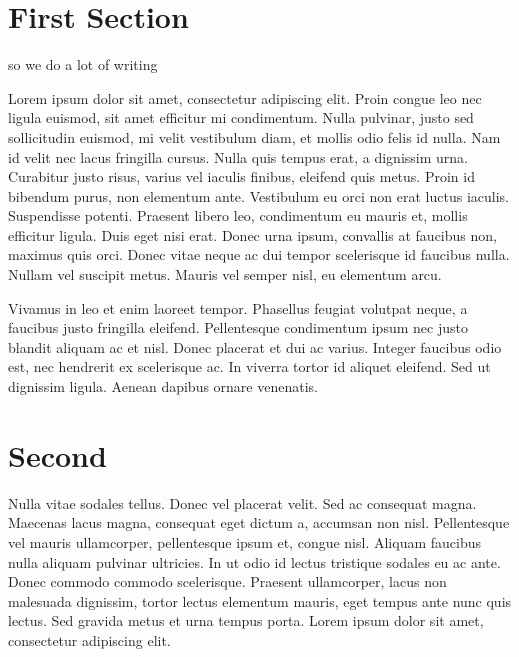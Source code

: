 \documentclass{article}
\begin{document}
    \begin{multicols}{2}
        \section{First Section}
        so we do a lot of writing

        Lorem ipsum dolor sit amet, consectetur adipiscing elit. Proin congue leo nec ligula euismod, sit amet efficitur mi condimentum. Nulla pulvinar, justo sed sollicitudin euismod, mi velit vestibulum diam, et mollis odio felis id nulla. Nam id velit nec lacus fringilla cursus. Nulla quis tempus erat, a dignissim urna. Curabitur justo risus, varius vel iaculis finibus, eleifend quis metus. Proin id bibendum purus, non elementum ante. Vestibulum eu orci non erat luctus iaculis. Suspendisse potenti. Praesent libero leo, condimentum eu mauris et, mollis efficitur ligula. Duis eget nisi erat. Donec urna ipsum, convallis at faucibus non, maximus quis orci. Donec vitae neque ac dui tempor scelerisque id faucibus nulla. Nullam vel suscipit metus. Mauris vel semper nisl, eu elementum arcu.

        Vivamus in leo et enim laoreet tempor. Phasellus feugiat volutpat neque, a faucibus justo fringilla eleifend. Pellentesque condimentum ipsum nec justo blandit aliquam ac et nisl. Donec placerat et dui ac varius. Integer faucibus odio est, nec hendrerit ex scelerisque ac. In viverra tortor id aliquet eleifend. Sed ut dignissim ligula. Aenean dapibus ornare venenatis.

        \section{Second}
        Nulla vitae sodales tellus. Donec vel placerat velit. Sed ac consequat magna. Maecenas lacus magna, consequat eget dictum a, accumsan non nisl. Pellentesque vel mauris ullamcorper, pellentesque ipsum et, congue nisl. Aliquam faucibus nulla aliquam pulvinar ultricies. In ut odio id lectus tristique sodales eu ac ante. Donec commodo commodo scelerisque. Praesent ullamcorper, lacus non malesuada dignissim, tortor lectus elementum mauris, eget tempus ante nunc quis lectus. Sed gravida metus et urna tempus porta. Lorem ipsum dolor sit amet, consectetur adipiscing elit.


\end{multicols}
\end{document}
